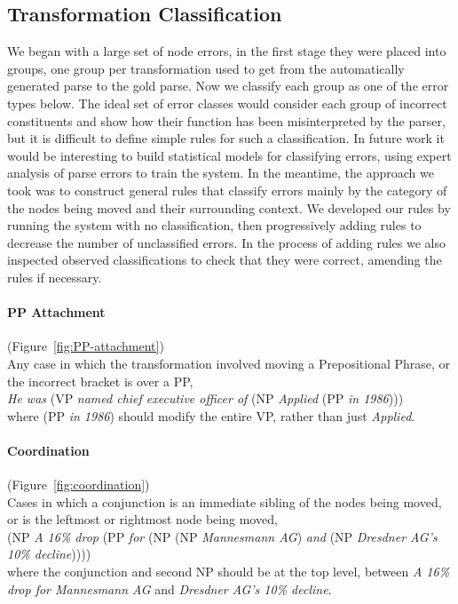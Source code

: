 \subsection{Transformation Classification} \label{sec:classify}

We began with a large set of node errors, in the first stage they were placed into groups, one group per transformation used to get from the automatically generated parse to the gold parse.
Now we classify each group as one of the error types below.
The ideal set of error classes would consider each group of incorrect constituents and show how their function has been misinterpreted by the parser, but it is difficult to define simple rules for such a classification.
In future work it would be interesting to build statistical models for classifying errors, using expert analysis of parse errors to train the system.
In the meantime, the approach we took was to construct general rules that classify errors mainly by the category of the nodes being moved and their surrounding context.
We developed our rules by running the system with no classification, then progressively adding rules to decrease the number of unclassified errors.
In the process of adding rules we also inspected observed classifications to check that they were correct, amending the rules if necessary.

\paragraph{PP Attachment} (Figure~\ref{fig:PP-attachment}) \\
Any case in which the transformation involved moving a Prepositional Phrase, or the incorrect bracket is over a PP, \myeg \\ 
\emph{He was} (VP \emph{named chief executive officer of} (NP \emph{Applied} (PP \emph{in 1986}))) \\
where (PP \emph{in 1986}) should modify the entire VP, rather than just \emph{Applied}.

\begin{figure}
\centering

\end{figure}

\paragraph{Coordination} (Figure~\ref{fig:coordination}) \\
Cases in which a conjunction is an immediate sibling of the nodes being moved, or is the leftmost or rightmost node being moved, \myeg \\
(NP \emph{A 16\% drop} (PP \emph{for} (NP (NP \emph{Mannesmann AG}) \emph{and} (NP \emph{Dresdner AG's 10\% decline})))) \\
where the conjunction and second NP should be at the top level, between \emph{A 16\% drop for Mannesmann AG} and \emph{Dresdner AG's 10\% decline}.

